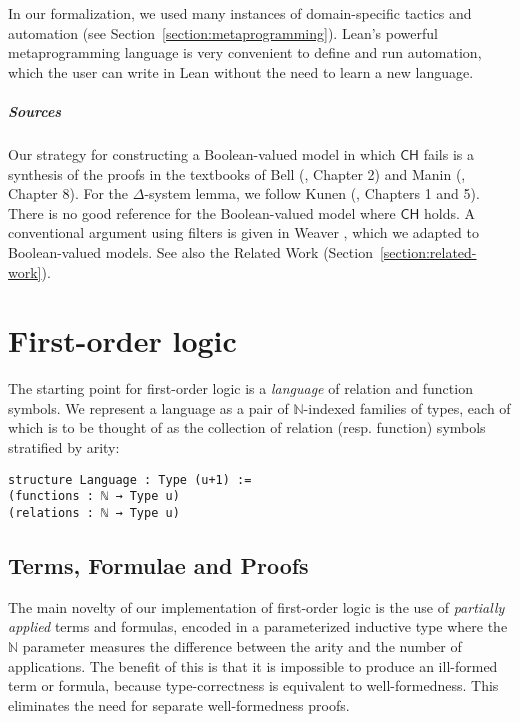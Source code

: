 \documentclass[sigplan,10pt,review, autoref,anonymous]{acmart}
\newcommand{\N}{\mathbb{N}}
\newcommand{\CH}{\mathsf{CH}}
\theoremstyle{definition}
\begin{document}
In our formalization, we used many instances of domain-specific tactics and automation (see Section~\autoref{section:metaprogramming}).
Lean's powerful metaprogramming language is very convenient to define and run automation, which the user can write in Lean without the need to learn a new language.

\subparagraph*{Sources} %
Our strategy for constructing a Boolean-valued model in which $\mathsf{CH}$ fails is a synthesis of the proofs in the textbooks of Bell (\cite{bell2011set}, Chapter 2) and Manin (\cite{manin2009course}, Chapter 8).
For the $\Delta$-system lemma, we follow Kunen (\cite{kunen2014set}, Chapters 1 and 5).
There is no good reference for the Boolean-valued model where $\CH$ holds.
A conventional argument using filters is given in Weaver \cite{weaver2014forcing}, which we adapted to Boolean-valued models.
See also the Related Work (Section~\autoref{section:related-work}).


\section{First-order logic}
\label{section:fol}

The starting point for first-order logic is a \emph{language} of relation and function symbols.
We represent a language as a pair of $\N$-indexed families of types, each of which is to be thought of as the collection of relation (resp. function) symbols stratified by arity:
\begin{lstlisting}
structure Language : Type (u+1) :=
(functions : ℕ → Type u)
(relations : ℕ → Type u)
\end{lstlisting}

\subsection{Terms, Formulae and Proofs}
\label{subsection:fol:terms}
The main novelty of our implementation of first-order logic is the use of \emph{partially applied} terms and formulas, encoded in a parameterized inductive type where the $\N$ parameter measures the difference between the arity and the number of applications.
The benefit of this is that it is impossible to produce an ill-formed term or formula, because type-correctness is equivalent to well-formedness.
This eliminates the need for separate well-formedness proofs.
\end{document}
